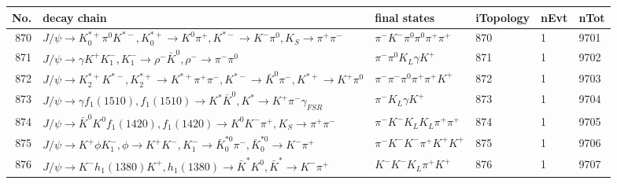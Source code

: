 \begin{table}[htbp] 
\begin{center}
\begin{small}
\begin{tabular}{rlllll}\hline\hline
 No. & decay chain & final states &  iTopology & nEvt & nTot \\\hline
870&$J/\psi       \rightarrow K_{0}^{*+}     \pi^{0}        K^{*-}         , K_{0}^{*+}      \rightarrow K^{0}          \pi^{+}        , K^{*-}          \rightarrow K^{-}          \pi^{0}        , K_{S}           \rightarrow \pi^{+}        \pi^{-}        $&$\pi^{-}        K^{-}          \pi^{0}        \pi^{0}        \pi^{+}        \pi^{+}        $&  870&    1& 9701\\
871&$J/\psi       \rightarrow \gamma       K^{+}          K_{1}^{-}      , K_{1}^{-}       \rightarrow \rho^{-}      \bar{K}^{0}   , \rho^{-}       \rightarrow \pi^{-}        \pi^{0}        $&$\pi^{-}        \pi^{0}        K_{L}          \gamma       K^{+}          $&  871&    1& 9702\\
872&$J/\psi       \rightarrow K_2^{*+}       K^{*-}         , K_2^{*+}        \rightarrow K^{*+}         \pi^{+}        \pi^{-}        , K^{*-}          \rightarrow \bar{K}^{0}   \pi^{-}        , K^{*+}          \rightarrow K^{+}          \pi^{0}        $&$\pi^{-}        \pi^{-}        \pi^{0}        \pi^{+}        \pi^{+}        K^{+}          $&  872&    1& 9703\\
873&$J/\psi       \rightarrow \gamma       f_{1}(1510)    , f_{1}(1510)     \rightarrow K^{*}          \bar{K}^{0}   , K^{*}           \rightarrow K^{+}          \pi^{-}        \gamma_{FSR} $&$\pi^{-}        K_{L}          \gamma       K^{+}          $&  873&    1& 9704\\
874&$J/\psi       \rightarrow \bar{K}^{0}   K^{0}          f_{1}(1420)    , f_{1}(1420)     \rightarrow K^{0}          K^{-}          \pi^{+}        , K_{S}           \rightarrow \pi^{+}        \pi^{-}        $&$\pi^{-}        K^{-}          K_{L}          K_{L}          \pi^{+}        \pi^{+}        $&  874&    1& 9705\\
875&$J/\psi       \rightarrow K^{+}          \phi           K_{1}^{-}      , \phi            \rightarrow K^{+}          K^{-}          , K_{1}^{-}       \rightarrow \bar{K}_0^{*0}\pi^{-}        , \bar{K}_0^{*0} \rightarrow K^{-}          \pi^{+}        $&$\pi^{-}        K^{-}          K^{-}          \pi^{+}        K^{+}          K^{+}          $&  875&    1& 9706\\
876&$J/\psi       \rightarrow K^{-}          h_{1}(1380)    K^{+}          , h_{1}(1380)     \rightarrow \bar{K}^{*}   K^{0}          , \bar{K}^{*}    \rightarrow K^{-}          \pi^{+}        $&$K^{-}          K^{-}          K_{L}          \pi^{+}        K^{+}          $&  876&    1& 9707\\

\end{tabular}
\end{small}
\end{center}
\end{table}
